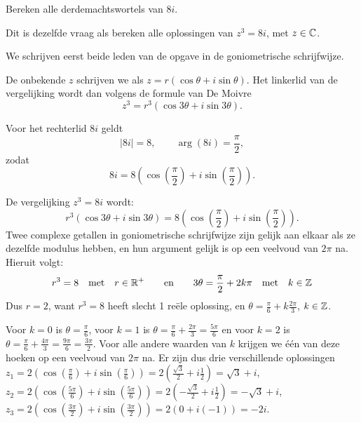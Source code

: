 \documentclass{ximera}
\begin{document}
\begin{basicSkip}
    \begin{exercise} Bereken alle derdemachtswortels van $8i$.
    \begin{hint} Dit is dezelfde vraag als bereken alle oplossingen van $z^3=8i$, met $z\in \mathbb{C}$.\end{hint}
        \begin{oplossing}
            We schrijven eerst beide leden van de opgave in de goniometrische schrijfwijze.
             
            De onbekende $z$ schrijven we als $z = r(\cos\theta+i\sin\theta)$. Het linkerlid van de vergelijking wordt dan volgens de formule van De Moivre $$z^3 = r^3 (\cos 3\theta+i\sin 3\theta).$$
             
            Voor het rechterlid $8i$ geldt
            \[ |8i| = 8, \qquad \arg (8i) =  \frac{\pi}{2}, \]
            zodat
            \[ 8i = 8( \cos(\frac{\pi}{2}) + i \sin(\frac{\pi}{2})). \]
             
            De
            vergelijking $z^3=8i$ wordt:
            $$r^3 (\cos 3\theta+i\sin 3\theta) = 8( \cos(\frac{\pi}{2}) + i \sin(\frac{\pi}{2})).$$
            Twee complexe getallen in goniometrische schrijfwijze zijn gelijk aan elkaar als ze dezelfde modulus hebben, en hun argument gelijk is op een veelvoud van $2 \pi$ na.
            Hieruit volgt:
            \[ r^3 = 8 \quad \text{met} \quad r\in \mathbb{R}^+ \qquad \text{en} \qquad 3 \theta =  \frac{\pi}{2} + 2 k \pi \quad \text{met} \quad k\in \mathbb{Z}\]
            Dus $r= 2$, want $r^3=8$ heeft slecht 1 reële oplossing, en $\theta =  \frac{\pi}{6} + k \frac{2\pi}{3}$, $k \in \mathbb{Z}$.
             
            Voor $k=0$ is
            $\theta =  \frac{\pi}{6}$, voor $k=1$ is $\theta =
            \frac{\pi}{6} + \frac{2\pi}{3} = \frac{5\pi}{6}$ en voor $k=2$ is $\theta =
            \frac{\pi}{6} + \frac{4\pi}{3} = \frac{9\pi}{6} = \frac{3\pi}{2}$. Voor alle andere waarden van $k$ krijgen we één van deze hoeken op een veelvoud van $2 \pi$ na. Er zijn dus drie verschillende oplossingen
            \\$ z_1 = 2( \cos(\frac{\pi}{6}) + i \sin(\frac{\pi}{6}))   = 2(\frac{\sqrt3}{2} + i \frac12)= \sqrt 3 + i$,
            \\$ z_2 = 2( \cos(\frac{5\pi}{6}) + i \sin(\frac{5\pi}{6})) =2(- \frac{\sqrt3}{2} + i \frac12)=-\sqrt 3 +i $,
            \\$ z_3 = 2( \cos(\frac{3\pi}{2}) + i \sin(\frac{3\pi}{2})) =2(0 + i (-1))=-2i $.
        \end{oplossing}
        \end{exercise}
    \end{basicSkip}
\end{document}
